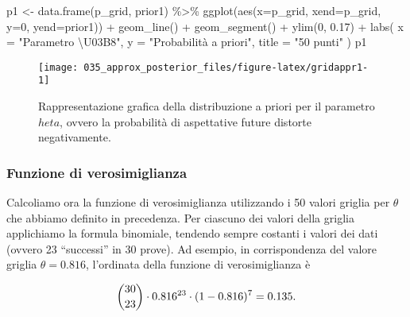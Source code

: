 \documentclass[
]{memoir}
\newenvironment{Shaded}{\begin{snugshade}}{\end{snugshade}}
\newcommand{\AttributeTok}[1]{\textcolor[rgb]{0.77,0.63,0.00}{#1}}
\newcommand{\DecValTok}[1]{\textcolor[rgb]{0.00,0.00,0.81}{#1}}
\newcommand{\FloatTok}[1]{\textcolor[rgb]{0.00,0.00,0.81}{#1}}
\newcommand{\FunctionTok}[1]{\textcolor[rgb]{0.00,0.00,0.00}{#1}}
\newcommand{\NormalTok}[1]{#1}
\newcommand{\OtherTok}[1]{\textcolor[rgb]{0.56,0.35,0.01}{#1}}
\newcommand{\SpecialCharTok}[1]{\textcolor[rgb]{0.00,0.00,0.00}{#1}}
\newcommand{\StringTok}[1]{\textcolor[rgb]{0.31,0.60,0.02}{#1}}
\begin{document}
\begin{Shaded}
\begin{Highlighting}[]
\NormalTok{p1 }\OtherTok{\textless{}{-}} \FunctionTok{data.frame}\NormalTok{(p\_grid, prior1) }\SpecialCharTok{\%\textgreater{}\%}
  \FunctionTok{ggplot}\NormalTok{(}\FunctionTok{aes}\NormalTok{(}\AttributeTok{x=}\NormalTok{p\_grid, }\AttributeTok{xend=}\NormalTok{p\_grid, }\AttributeTok{y=}\DecValTok{0}\NormalTok{, }\AttributeTok{yend=}\NormalTok{prior1)) }\SpecialCharTok{+}
  \FunctionTok{geom\_line}\NormalTok{() }\SpecialCharTok{+}
  \FunctionTok{geom\_segment}\NormalTok{() }\SpecialCharTok{+}
  \FunctionTok{ylim}\NormalTok{(}\DecValTok{0}\NormalTok{, }\FloatTok{0.17}\NormalTok{) }\SpecialCharTok{+}
  \FunctionTok{labs}\NormalTok{(}
    \AttributeTok{x =} \StringTok{"Parametro \textbackslash{}U03B8"}\NormalTok{,}
    \AttributeTok{y =} \StringTok{"Probabilità a priori"}\NormalTok{,}
    \AttributeTok{title =} \StringTok{"50 punti"}
\NormalTok{  )}
\NormalTok{p1}
\end{Highlighting}
\end{Shaded}

\begin{figure}

{\centering \texttt{[image: 035\_approx\_posterior\_files/figure-latex/gridappr1-1]} 

}

\caption{Rappresentazione grafica della distribuzione a priori per il parametro $   heta$, ovvero la probabilità di aspettative future distorte negativamente.}\label{fig:gridappr1}
\end{figure}

\hypertarget{funzione-di-verosimiglianza}{%
\subsubsection{Funzione di verosimiglianza}\label{funzione-di-verosimiglianza}}

Calcoliamo ora la funzione di verosimiglianza utilizzando i 50 valori griglia per \(\theta\) che abbiamo definito in precedenza. Per ciascuno dei valori della griglia applichiamo la formula binomiale, tendendo sempre costanti i valori dei dati (ovvero 23 ``successi'' in 30 prove). Ad esempio, in corrispondenza del valore griglia \(\theta = 0.816\), l'ordinata della funzione di verosimiglianza è

\begin{equation}
\binom{30}{23} \cdot 0.816^{23} \cdot (1 - 0.816)^{7} = 0.135.\notag
\end{equation}
\end{document}
